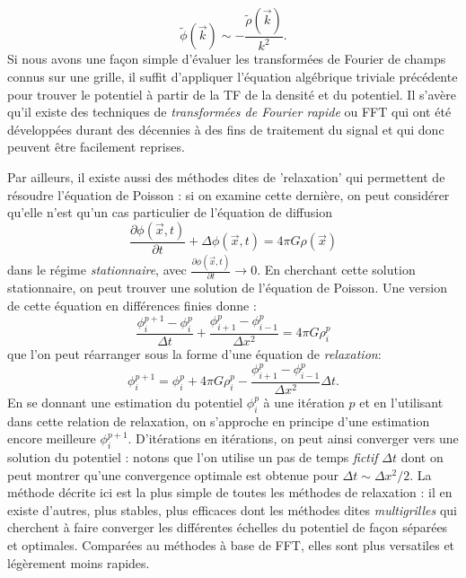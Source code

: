 \begin{equation}
\tilde \phi(\vec k)\sim -\frac{\tilde \rho(\vec k)}{k^2}.
\end{equation} 
Si nous avons une façon simple d'évaluer les transformées de Fourier de champs connus sur une grille, il suffit d'appliquer l'équation algébrique triviale précédente pour trouver le potentiel à partir de la TF de la densité et du potentiel. Il s'avère qu'il existe des techniques de \textit{transformées de Fourier rapide} ou FFT qui ont été développées durant des décennies à des fins de traitement du signal et qui donc peuvent être facilement reprises. 

Par ailleurs, il existe aussi des méthodes dites de 'relaxation' qui permettent de résoudre l'équation de Poisson : si on examine cette dernière, on peut considérer qu'elle n'est qu'un cas particulier de l'équation de diffusion
\begin{equation}
\frac{\partial \phi(\vec x,t)}{\partial t}+\Delta \phi(\vec x,t) = 4\pi G \rho(\vec x)
\end{equation}
dans le régime \textit{stationnaire}, avec $\frac{\partial \phi(\vec x,t)}{\partial t}\rightarrow 0$. En cherchant cette solution stationnaire, on peut trouver une solution de l'équation de Poisson. Une version de cette équation en différences finies donne :
\begin{equation}
\frac{\phi^{p+1}_i-\phi^{p}_i}{\Delta t}+\frac{\phi^{p}_{i+1}-\phi^{p}_{i-1}}{\Delta x^2}=4\pi G\rho^{p}_i
\end{equation}
que l'on peut réarranger sous la forme d'une équation de \textit{relaxation}:
\begin{equation}
\phi^{p+1}_i=\phi^{p}_i+4\pi G\rho^{p}_i-\frac{\phi^{p}_{i+1}-\phi^{p}_{i-1}}{\Delta x^2}\Delta t.
\end{equation}
En se donnant une estimation du potentiel $\phi^{p}_i$ à une itération $p$ et en l'utilisant dans cette relation de relaxation, on s'approche en principe d'une estimation encore meilleure $\phi^{p+1}_i$. D'itérations en itérations, on peut ainsi converger vers une solution du potentiel : notons que l'on utilise un pas de temps \textit{fictif} $\Delta t$ dont on peut montrer qu'une convergence optimale est obtenue pour $\Delta t\sim \Delta x^2/2$. La méthode décrite ici est la plus simple de toutes les méthodes de relaxation : il en existe d'autres, plus stables, plus efficaces dont les méthodes dites \textit{multigrilles} qui cherchent à faire converger les différentes échelles du potentiel de façon séparées et optimales. Comparées au méthodes à base de FFT, elles sont plus versatiles et légèrement moins rapides.


